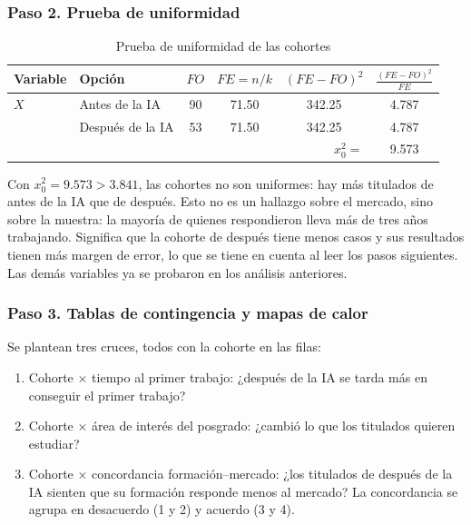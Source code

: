\documentclass[12pt, a4paper]{article}
\newenvironment{mitabla}[2][H]{%
  \begin{table}[#1]
  \centering
  \caption{#2}
  \small
}{%
  \end{table}
}
\begin{document}
\subsubsection{Paso 2. Prueba de uniformidad}

\begin{mitabla}{Prueba de uniformidad de las cohortes}\label{tab:a4-unif}
\begin{tabular}{llcccc}
\toprule
\textbf{Variable} & \textbf{Opción} & \textbf{$FO$} & \textbf{$FE = n/k$} & \textbf{$(FE-FO)^2$} & \textbf{$\frac{(FE-FO)^2}{FE}$} \\
\midrule
$X$ & Antes de la IA & 90 & 71.50 & 342.25 & 4.787 \\
 & Después de la IA & 53 & 71.50 & 342.25 & 4.787 \\
 & \multicolumn{4}{r}{$x_0^2 =$} & 9.573 \\
\bottomrule
\end{tabular}
\end{mitabla}

Con $x_0^2 = 9.573 > 3.841$, las cohortes no son uniformes: hay más
titulados de antes de la IA que de después. Esto no es un hallazgo sobre
el mercado, sino sobre la muestra: la mayoría de quienes respondieron
lleva más de tres años trabajando. Significa que la cohorte de después
tiene menos casos y sus resultados tienen más margen de error, lo que se
tiene en cuenta al leer los pasos siguientes. Las demás variables ya se
probaron en los análisis anteriores.

\subsubsection{Paso 3. Tablas de contingencia y mapas de calor}

Se plantean tres cruces, todos con la cohorte en las filas:

\begin{enumerate}
  \item Cohorte $\times$ tiempo al primer trabajo: ¿después de la IA se
  tarda más en conseguir el primer trabajo?
  \item Cohorte $\times$ área de interés del posgrado: ¿cambió lo que
  los titulados quieren estudiar?
  \item Cohorte $\times$ concordancia formación--mercado: ¿los titulados
  de después de la IA sienten que su formación responde menos al
  mercado? La concordancia se agrupa en desacuerdo (1 y 2) y acuerdo (3 y
  4).
\end{enumerate}
\end{document}
